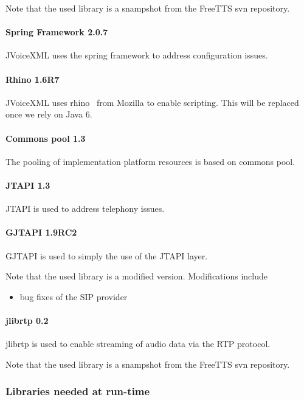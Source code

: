 \documentclass[11pt,a4paper]{article}
\begin{document}
Note that the used library is a snampshot from the FreeTTS svn repository.

\paragraph{Spring Framework 2.0.7}
\label{sec:spring-framework}

JVoiceXML uses the spring framework to address configuration
issues.

\paragraph{Rhino 1.6R7}

JVoiceXML uses rhino~\cite{rhino} from Mozilla to enable scripting.
This will be replaced once we rely on Java 6.

\paragraph{Commons pool 1.3}

The pooling of implementation platform resources is based on commons
pool.

\paragraph{JTAPI 1.3}

JTAPI is used to address telephony issues.

\paragraph{GJTAPI 1.9RC2}

GJTAPI is used to simply the use of the JTAPI layer.

Note that the used library is a modified version. Modifications include
\begin{itemize}
\item bug fixes of the SIP provider
\end{itemize}

\paragraph{jlibrtp 0.2}

jlibrtp is used to enable streaming of audio data via the RTP protocol.

Note that the used library is a snampshot from the FreeTTS svn repository.

\subsubsection{Libraries needed at run-time}
\end{document}
